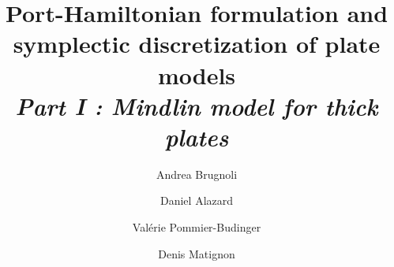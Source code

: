 \documentclass[preprint,12pt]{elsarticle}
\begin{document}
	
	\begin{frontmatter}	
		
		\title{Port-Hamiltonian formulation and \\ symplectic discretization of plate models \\
		\vspace{2mm}\large\textit{Part I : Mindlin model for thick plates}}	
		\author[ISAE]{Andrea Brugnoli}
		
		\author[ISAE]{Daniel Alazard}
		
		\author[ISAE]{Valérie Pommier-Budinger}
		
		\author[ISAE]{Denis Matignon}
		
		
		
		\address[ISAE]{ISAE-SUPAERO, Universit\'e de Toulouse, France.\\
		\vspace{2mm} {10 Avenue Edouard Belin, BP-54032, 31055 Toulouse Cedex 4.}}
		

\end{frontmatter}
\end{document}
